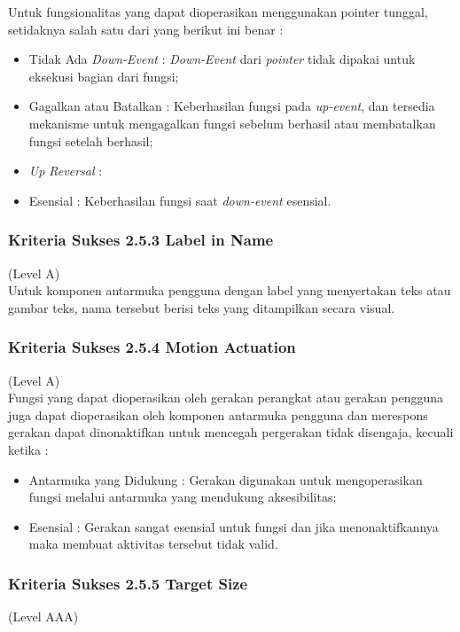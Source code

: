 \documentclass[a4paper,twoside]{article}
\begin{document}
\begin{enumerate}
		Untuk fungsionalitas yang dapat dioperasikan menggunakan pointer tunggal, setidaknya salah satu dari yang berikut ini benar :
		
		\begin{itemize}
			\item Tidak Ada \textit{Down-Event} : \textit{Down-Event} dari \textit{pointer} tidak dipakai untuk eksekusi bagian dari fungsi;
			\item Gagalkan atau Batalkan : Keberhasilan fungsi pada \textit{up-event}, dan tersedia mekanisme untuk mengagalkan fungsi sebelum berhasil atau membatalkan fungsi setelah berhasil;
			\item \textit{Up Reversal} : 
			\item Esensial : Keberhasilan fungsi saat \textit{down-event} esensial.
		\end{itemize}
		
		\subsubsection*{Kriteria Sukses 2.5.3 Label in Name}
		\label{subsubsec:kriteria_2.5.3}
		(Level A) \\
		
		Untuk komponen antarmuka pengguna dengan label yang menyertakan teks atau gambar teks, nama tersebut berisi teks yang ditampilkan secara visual.
		
		\subsubsection*{Kriteria Sukses 2.5.4 Motion Actuation}
		\label{subsubsec:kriteria_2.5.4}
		(Level A) \\
		
		Fungsi yang dapat dioperasikan oleh gerakan perangkat atau gerakan pengguna juga dapat dioperasikan oleh komponen antarmuka pengguna dan merespons gerakan dapat dinonaktifkan untuk mencegah pergerakan tidak disengaja, kecuali ketika :
		
		\begin{itemize}
			\item Antarmuka yang Didukung : Gerakan digunakan untuk mengoperasikan fungsi melalui antarmuka yang mendukung aksesibilitas;
			\item Esensial : Gerakan sangat esensial untuk fungsi dan jika menonaktifkannya maka membuat aktivitas tersebut tidak valid.
		\end{itemize}
		
		\subsubsection*{Kriteria Sukses 2.5.5 Target Size}
		\label{subsubsec:kriteria_2.5.5}
		(Level AAA) \\
		

\end{enumerate}
\end{document}
